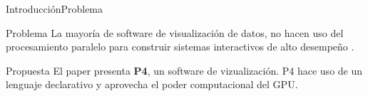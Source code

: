 \documentclass[10pt]{beamer}
\newcommand{\1}{
	\setbeamertemplate{background}{
		\texttt{[image: img/1]}
		\tikz[overlay] \fill[fill opacity=0.75,fill=white] (0,0) rectangle (-\paperwidth,\paperheight);
	}
}
\begin{document}
\begin{frame}{Introducción}{Problema}	
\begin{block}{Problema}
	La mayoría de software de visualización de datos, no hacen uso del procesamiento paralelo para construir sistemas interactivos de alto desempeño \cite{li2018p4}.		
\end{block}
\pause
\begin{block}{Propuesta}
	El paper presenta \textbf{P4}, un software de vizualización. P4 hace uso de un lenguaje declarativo y aprovecha el poder computacional del GPU.		
\end{block}	
\end{frame}


\end{document}
